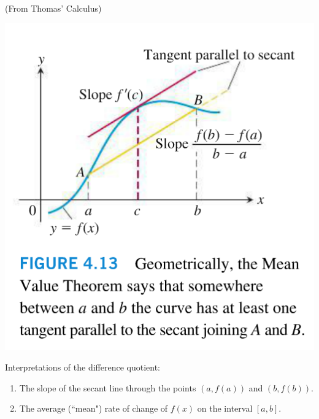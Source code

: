 \documentclass[12pt]{report}
\begin{document}
\begin{multicols}{2}

(From Thomas' Calculus) 

\includegraphics[scale=0.75]{MVTpic.png}


\vspace{1in}
Interpretations of the difference quotient: \\

\begin{enumerate}

\item The slope of the secant line through the points $(a, f(a))$ and $(b, f(b))$. \\

\item The average (``mean") rate of change of $f(x)$ on the interval $[a,b]$. \\

\end{enumerate}

\end{multicols}

\newpage
\end{document}
